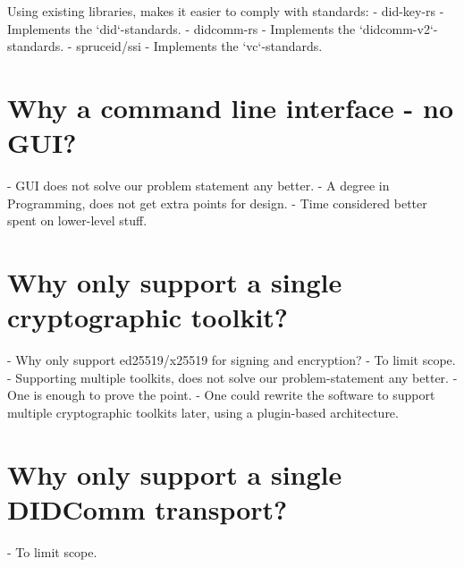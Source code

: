 Using existing libraries, makes it easier to comply with standards:
- did-key-rs - Implements the `did`-standards.
- didcomm-rs - Implements the `didcomm-v2`-standards.
- spruceid/ssi - Implements the `vc`-standards.

\section{Why a command line interface - no GUI?}

- GUI does not solve our problem statement any better.
- A degree in Programming, does not get extra points for design.
- Time considered better spent on lower-level stuff.

\section{Why only support a single cryptographic toolkit?}

- Why only support ed25519/x25519 for signing and encryption?
- To limit scope.
- Supporting multiple toolkits, does not solve our problem-statement any better.
- One is enough to prove the point.
- One could rewrite the software to support multiple cryptographic toolkits later, using a plugin-based architecture.

\section{Why only support a single DIDComm transport?}

- To limit scope.
